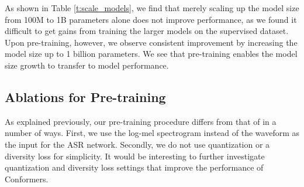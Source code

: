 \documentclass[dvipsnames]{article}
\begin{document}
As shown in Table \ref{t:scale_models}, we find that merely scaling up the model size from 100M to 1B parameters alone does not improve performance, as we found it difficult to get gains from training the larger models on the supervised dataset. Upon pre-training, however, we observe consistent improvement by increasing the model size up to 1 billion parameters. We see that pre-training enables the model size growth to transfer to model performance.
\begin{table}[h!]
  \vskip -0.05in
  \caption{WERs(\%) from LibriSpeech experiments. LM fusion has not been used.}
  \vskip 0.1in
  \label{t:scale_models}
  \centering
  \small
\end{table}

\subsection{Ablations for Pre-training}

As explained previously, our pre-training procedure differs from that of \cite{wav2vec2} in a number of ways. First, we use the log-mel spectrogram instead of the waveform as the input for the ASR network. Secondly, we do not use quantization or a diversity loss for simplicity. It would be interesting to further investigate quantization and diversity loss settings that improve the performance of Conformers.
\end{document}
